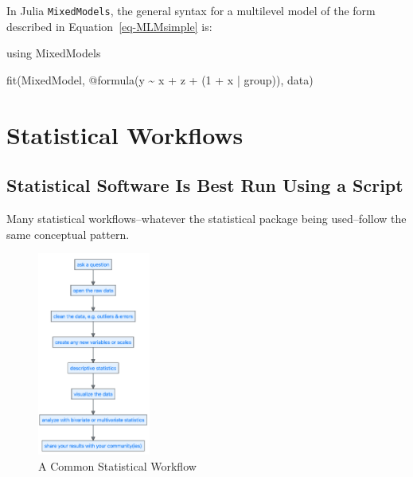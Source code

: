 \documentclass[
  letterpaper,
  DIV=11,
  numbers=noendperiod]{scrreprt}
\newenvironment{Shaded}{\begin{snugshade}}{\end{snugshade}}
\newcommand{\BuiltInTok}[1]{\textcolor[rgb]{0.00,0.23,0.31}{#1}}
\newcommand{\FloatTok}[1]{\textcolor[rgb]{0.68,0.00,0.00}{#1}}
\newcommand{\FunctionTok}[1]{\textcolor[rgb]{0.28,0.35,0.67}{#1}}
\newcommand{\ImportTok}[1]{\textcolor[rgb]{0.00,0.46,0.62}{#1}}
\newcommand{\NormalTok}[1]{\textcolor[rgb]{0.00,0.23,0.31}{#1}}
\newcommand{\OperatorTok}[1]{\textcolor[rgb]{0.37,0.37,0.37}{#1}}
\newcommand{\PreprocessorTok}[1]{\textcolor[rgb]{0.68,0.00,0.00}{#1}}
\begin{document}
In Julia \texttt{MixedModels}, the general syntax for a multilevel model
of the form described in Equation~\ref{eq-MLMsimple} is:

\begin{Shaded}
\begin{Highlighting}[]
\ImportTok{using} \BuiltInTok{MixedModels}

\FunctionTok{fit}\NormalTok{(MixedModel, }\PreprocessorTok{@formula}\NormalTok{(y }\OperatorTok{\textasciitilde{}}\NormalTok{ x }\OperatorTok{+}\NormalTok{ z }\OperatorTok{+}\NormalTok{ (}\FloatTok{1} \OperatorTok{+}\NormalTok{ x }\OperatorTok{|}\NormalTok{ group)), data)}
\end{Highlighting}
\end{Shaded}


\chapter{Statistical Workflows}\label{statistical-workflows}

\section{Statistical Software Is Best Run Using a
Script}\label{statistical-software-is-best-run-using-a-script}

Many statistical workflows--whatever the statistical package being
used--follow the same conceptual pattern.

\begin{figure}[H]

{\centering \includegraphics[width=0.33\textwidth,height=\textheight]{workflow.png}

}

\caption{A Common Statistical Workflow}

\end{figure}%
\end{document}
